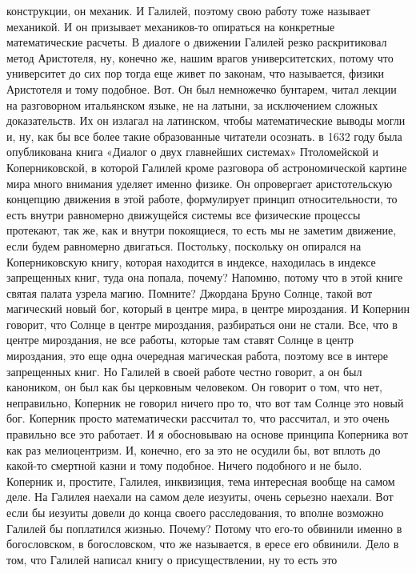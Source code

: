 конструкции, он механик. И Галилей, поэтому свою работу тоже называет механикой.
И он призывает механиков-то опираться на конкретные математические расчеты. В
диалоге о движении Галилей резко раскритиковал метод Аристотеля, ну, конечно же,
нашим врагов университетских, потому что университет до сих пор тогда еще живет
по законам, что называется, физики Аристотеля и тому подобное. Вот. Он был
немножечко бунтарем, читал лекции на разговорном итальянском языке, не на
латыни, за исключением сложных доказательств. Их он излагал на латинском, чтобы
математические выводы могли и, ну, как бы все более такие образованные читатели
осознать. в 1632 году была опубликована книга «Диалог о двух главнейших
системах» Птоломейской и Коперниковской, в которой Галилей кроме разговора об
астрономической картине мира много внимания уделяет именно физике. Он
опровергает аристотельскую концепцию движения в этой работе, формулирует принцип
относительности, то есть внутри равномерно движущейся системы все физические
процессы протекают, так же, как и внутри покоящиеся, то есть мы не заметим
движение, если будем равномерно двигаться. Постольку, поскольку он опирался на
Коперниковскую книгу, которая находится в индексе, находилась в индексе
запрещенных книг, туда она попала, почему? Напомню, потому что в этой книге
святая палата узрела магию. Помните? Джордана Бруно Солнце, такой вот магический
новый бог, который в центре мира, в центре мироздания. И Копернин говорит, что
Солнце в центре мироздания, разбираться они не стали. Все, что в центре
мироздания, не все работы, которые там ставят Солнце в центр мироздания, это еще
одна очередная магическая работа, поэтому все в интере запрещенных книг. Но
Галилей в своей работе честно говорит, а он был каноником, он был как бы
церковным человеком. Он говорит о том, что нет, неправильно, Коперник не говорил
ничего про то, что вот там Солнце это новый бог. Коперник просто математически
рассчитал то, что рассчитал, и это очень правильно все это работает. И я
обосновываю на основе принципа Коперника вот как раз мелиоцентризм. И, конечно,
его за это не осудили бы, вот вплоть до какой-то смертной казни и тому подобное.
Ничего подобного и не было. Коперник и, простите, Галилея, инквизиция, тема
интересная вообще на самом деле. На Галилея наехали на самом деле иезуиты, очень
серьезно наехали. Вот если бы иезуиты довели до конца своего расследования, то
вполне возможно Галилей бы поплатился жизнью. Почему? Потому что его-то обвинили
именно в богословском, в богословском, что же называется, в ересе его обвинили.
Дело в том, что Галилей написал книгу о присуществлении, ну то есть это
